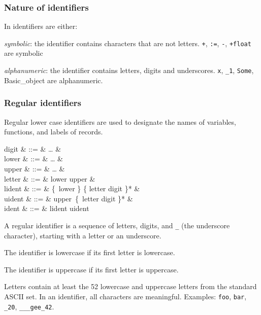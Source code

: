 \subsubsection{Nature of identifiers}

In {\focal} identifiers are either:

\begin{citemize}
\item {\em symbolic}: the identifier contains characters that are not
  letters. {\tt +}, {\tt :=}, {\tt -\>}, {\tt +float} are symbolic

\item {\em alphanumeric}: the identifier contains letters, digits and
  underscores. {\tt x}, {\tt _1}, {\tt Some}, {Basic_object} are alphanumeric.
\end{citemize}

\subsubsection{Regular identifiers}

Regular lower case identifiers are used to designate the names of variables, functions,
and labels of records.

\begin{syntax}
digit & ::= &  \ldots {} & \\
lower & ::= &  \ldots {} & \\
upper & ::= &  \ldots {} & \\
letter & ::= & lower \mid upper & \\
lident & ::= & \{\ lower \mid \terminal{\_} \}
            \{ letter \mid digit \mid \terminal{\_} \}* & \\
uident & ::= & upper\ \{\ letter \mid digit \mid \terminal{\_} \}* & \\
ident & ::= & lident \mid uident
\end{syntax}
\vspace{0.2cm}

A regular identifier is a sequence of letters, digits, and {\tt \_} (the
underscore character), starting with a letter or an underscore.

The identifier is lowercase if its first letter is lowercase.

The identifier is uppercase if its first letter is uppercase.

Letters contain at least the 52 lowercase and uppercase
letters from the standard ASCII set. In an identifier, all characters
are meaningful.
Examples: {\tt foo}, {\tt bar}, {\tt \_20}, {\tt \_\_\_gee\_42}.


